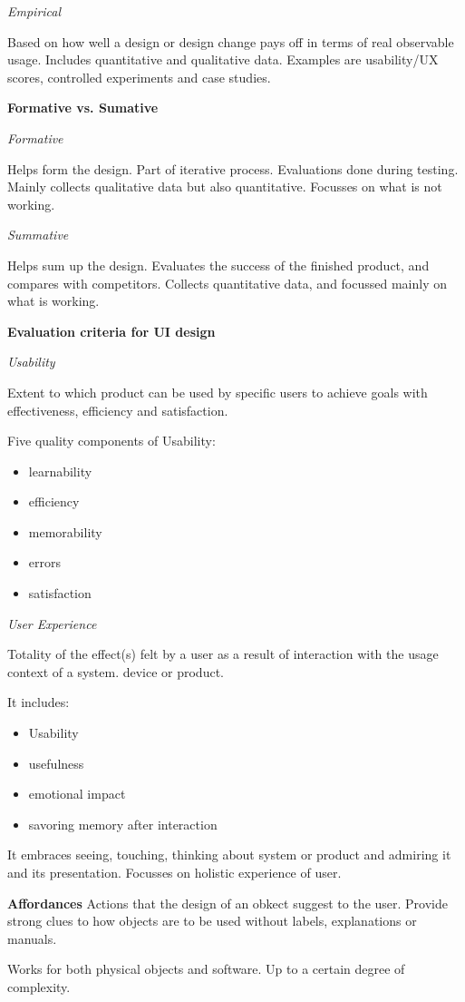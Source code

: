 \textit{Empirical} \smallskip

Based on how well a design or design change pays off in terms of real observable usage. Includes quantitative and qualitative data. 
Examples are usability/UX scores, controlled experiments and case studies. 

\textbf{Formative vs. Sumative} \smallskip

\textit{Formative} \smallskip

Helps form the design. Part of iterative process. Evaluations done during testing. Mainly collects qualitative data but also quantitative. Focusses on what is not working.\smallskip

\textit{Summative} \smallskip

Helps sum up the design. Evaluates the success of the finished product, and compares with competitors. Collects quantitative data, and focussed mainly on what is working. \medskip


\textbf{Evaluation criteria for UI design} \smallskip

\textit{Usability} \smallskip

Extent to which product can be used by specific users to achieve goals with effectiveness, efficiency and satisfaction.

Five quality components of Usability:

\begin{multicols}{2}
    \begin{itemize}[itemsep=-5pt, topsep=-20pt, leftmargin=*]
	\item learnability
	\item efficiency
	\item memorability
	\item errors
	\item satisfaction
	\end{itemize}
\end{multicols}

\textit{User Experience} \smallskip

Totality of the effect(s) felt by a user as a result of interaction with the usage context of a system. device or product. 

It includes:  
\begin{multicols}{2}
    \begin{itemize}[itemsep=-5pt, topsep=-20pt, leftmargin=*]
	\item Usability
	\item usefulness
	\item emotional impact
	\item savoring memory after interaction
	\end{itemize}
\end{multicols}
It embraces seeing, touching, thinking about system or product and admiring it and its presentation.
Focusses on holistic experience of user. \medskip


\textbf{Affordances}
Actions that the design of an obkect suggest to the user. Provide strong clues to how objects are to be used without labels, explanations or manuals. \smallskip

Works for both physical objects and software. Up to a certain degree of complexity. 